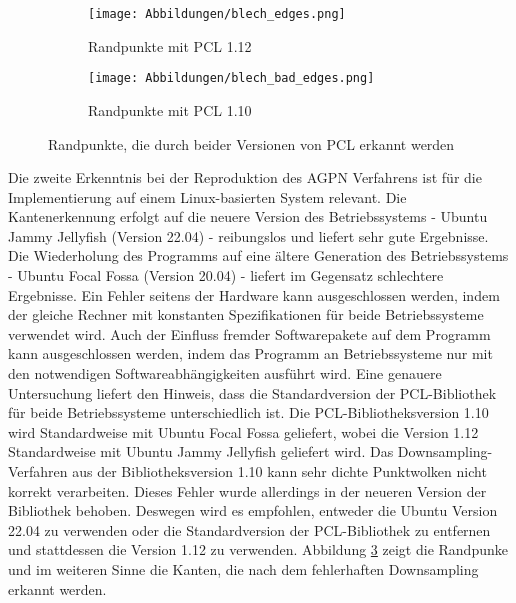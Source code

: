 \begin{figure}[b]
	\centering
	\begin{subfigure}[h]{0.49\textwidth}
		\texttt{[image: Abbildungen/blech\_edges.png]}
		\centering
		\caption{Randpunkte mit PCL 1.12}
		\label{fig: blech_edges}
	\end{subfigure}
	\hfill
	\begin{subfigure}[h]{0.49\textwidth}
		\texttt{[image: Abbildungen/blech\_bad\_edges.png]}
		\centering
		\caption{Randpunkte mit PCL 1.10}
		\label{fig: bad_edges}
	\end{subfigure}
	\caption{Randpunkte, die durch beider Versionen von PCL erkannt werden}
	\label{fig: pcl_version_comparision}
\end{figure}

Die zweite Erkenntnis bei der Reproduktion des AGPN Verfahrens ist für die Implementierung auf einem Linux-basierten System relevant. Die Kantenerkennung erfolgt auf die neuere Version des Betriebssystems - Ubuntu Jammy Jellyfish (Version 22.04) - reibungslos und liefert sehr gute Ergebnisse. Die Wiederholung des Programms auf eine ältere Generation des Betriebssystems - Ubuntu Focal Fossa (Version 20.04) - liefert im Gegensatz schlechtere Ergebnisse. Ein Fehler seitens der Hardware kann ausgeschlossen werden, indem der gleiche Rechner mit konstanten Spezifikationen für beide Betriebssysteme verwendet wird. Auch der Einfluss fremder Softwarepakete auf dem Programm kann ausgeschlossen werden, indem das Programm an Betriebssysteme nur mit den notwendigen Softwareabhängigkeiten ausführt wird. Eine genauere Untersuchung liefert den Hinweis, dass die Standardversion der PCL-Bibliothek für beide Betriebssysteme unterschiedlich ist. Die PCL-Bibliotheksversion 1.10 wird Standardweise mit Ubuntu Focal Fossa geliefert, wobei die Version 1.12 Standardweise mit Ubuntu Jammy Jellyfish geliefert wird. Das Downsampling-Verfahren aus der Bibliotheksversion 1.10 kann sehr dichte Punktwolken nicht korrekt verarbeiten. Dieses Fehler wurde allerdings in der neueren Version der Bibliothek behoben. Deswegen wird es empfohlen, entweder die Ubuntu Version 22.04 zu verwenden oder die Standardversion der PCL-Bibliothek zu entfernen und stattdessen die Version 1.12 zu verwenden. Abbildung \ref{fig: pcl_version_comparision} zeigt die Randpunke und im weiteren Sinne die Kanten, die nach dem fehlerhaften Downsampling erkannt werden.



